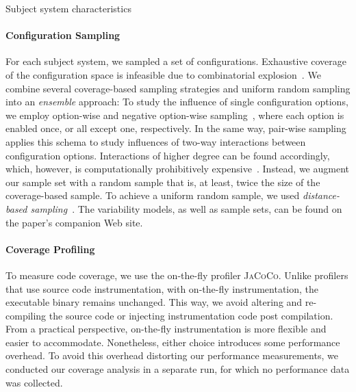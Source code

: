 \begin{table}[ht!]
		\centering
		\caption{Subject system characteristics}
		
		\label{tab:subject_systems}
	\end{table}

\paragraph*{Configuration Sampling}\label{sec:sampling}
For each subject system, we sampled a set of configurations. Exhaustive coverage of the configuration space is infeasible due to combinatorial explosion~\cite{henardCombining2015}. We combine several coverage-based sampling strategies and uniform random sampling into an \emph{ensemble} approach: To study the influence of single configuration options, we employ option-wise and negative option-wise sampling~\cite{siegmundPerformanceinfluenceModelsHighly2015}, where each option is enabled once, or all except one, respectively. In the same way, pair-wise sampling applies this schema to study influences of two-way interactions between configuration options. Interactions of higher degree can be found accordingly, which, however, is computationally prohibitively expensive~\cite{henardCombining2015}. Instead, we augment our sample set with a random sample that is, at least, twice the size of the coverage-based sample. To achieve a uniform random sample, we used \emph{distance-based sampling}~\cite{kaltenecker_distance-based_2019}. The variability models, as well as sample sets, can be found on the paper's companion Web site.
	
\paragraph*{Coverage Profiling}\label{sec:profiling}
To measure code coverage, we use the on-the-fly profiler \textsc{JaCoCo}. Unlike profilers that use source code instrumentation, with on-the-fly instrumentation, the executable binary remains unchanged. This way, we avoid altering and re-compiling the source code or injecting instrumentation code post compilation. From a practical perspective, on-the-fly instrumentation is more flexible and easier to accommodate. Nonetheless, either choice introduces some performance overhead. To avoid this overhead distorting our performance measurements, we conducted our coverage analysis in a separate run, for which no performance data was collected. 	
	
